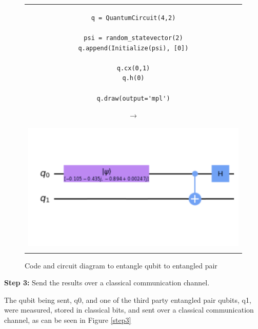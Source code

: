 \begin{figure}[H]
\centering
\begin{tabular}{c}
\begin{minipage}[c]{.45\linewidth}
\begin{verbatim}
q = QuantumCircuit(4,2)

psi = random_statevector(2)
q.append(Initialize(psi), [0])

q.cx(0,1)
q.h(0)

q.draw(output='mpl')
\end{verbatim}
\end{minipage}
\begin{minipage}[c]{.1\linewidth}
\centering
$\rightarrow$
\end{minipage}
\begin{minipage}[c]{.4\linewidth}
\centering
\includegraphics[width=\textwidth]{lab3/images/Step2.png}
\end{minipage}\\
\\ 
\end{tabular}
\caption{Code and circuit diagram to entangle qubit to entangled pair}
\label{step2}
\end{figure}


\textbf{Step 3:} Send the results over a classical communication channel.

The qubit being sent, q0, and one of the third party entangled pair qubits, q1, were measured, stored in classical bits, and sent over a classical communication channel, as can be seen in Figure \ref{step3}

